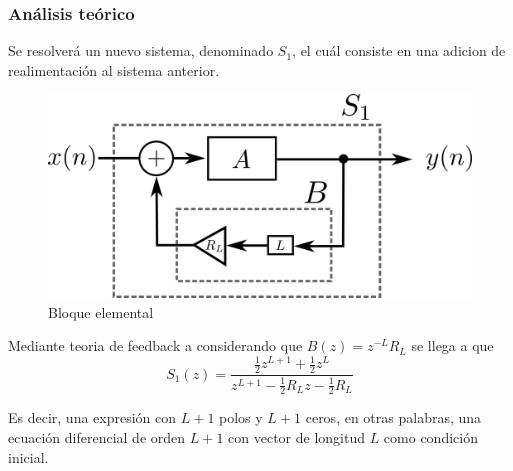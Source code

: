 \documentclass[assd_tp2_main.tex]{subfiles}
\begin{document}
\subsubsection{Análisis teórico}
Se resolverá un nuevo sistema, denominado $S_1$, el cuál consiste en una adicion de realimentación al sistema anterior.
\begin{figure}[H]	
	\centering
	\includegraphics[scale=1]{graficos/bloque2ej5.png}
	\caption{Bloque elemental}
	\label{fig:bloqueElemental}
\end{figure}

Mediante teoria de feedback a considerando que $B(z)=z^{-L}R_L$ se llega a que
\begin{equation}
S_1(z)=\frac{ \frac{1}{2} z^{L+1} + \frac{1}{2}z^L}{ z^{L+1} - \frac{1}{2}R_L z-\frac{1}{2}R_L } 
\end{equation}

Es decir, una expresión con $L+1$ polos y $L+1$ ceros, en otras palabras, una ecuación diferencial de orden $L+1$ con vector de longitud $L$ como condición inicial.
\end{document}

